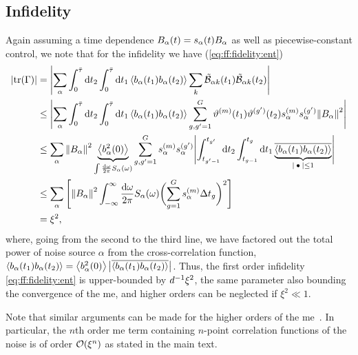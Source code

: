 \subsection{Infidelity}\label{subsec:app:ff:convergence:infidelity}
Again assuming a time dependence $B_\alpha(t) = s_\alpha(t)B_\alpha$ as well as piecewise-constant control, we note that for the infidelity we have (\cf \cref{eq:ff:fidelity:ent})
\begin{align}
    \abs{\tr(\decayamps)} &= \abs\Bigg{\sum_{\alpha}\int_0^{\bar{\tau}}\dd{t_2}\int_0^{\bar{\tau}}\dd{t_1}
                             \expval{b_\alpha(t_1)b_\alpha(t_2)}\sum_{k}\ctrlmat_{\alpha k}(t_1)\ctrlmat_{\alpha k}(t_2)} \notag\\
                          &\leq\abs\Bigg{\sum_{\alpha}\int_0^{\bar{\tau}}\dd{t_2}\int_0^{\bar{\tau}}\dd{t_1}
                             \expval{b_\alpha(t_1)b_\alpha(t_2)}\sum_{g,g^\prime=1}^{G}\vartheta\gth{m}(t_1)\vartheta^{(g^\prime)}(t_2)
                             s_\alpha\gth{m} s_\alpha^{(g^\prime)} \norm{B_\alpha}^2} \notag\\
                          &\leq\sum_{\alpha}\norm{B_\alpha}^2
                             \underbrace{\expval{b_\alpha^2(0)}}_{\int\frac{\dd{\omega}}{2\pi}S_\alpha(\omega)}
                             \sum_{g,g^\prime=1}^{G} s_\alpha\gth{m} s_\alpha^{(g^\prime)}
                             \abs\Bigg{\int_{t_{g^\prime-1}}^{t_{g^\prime}}\dd{t_2}\int_{t_{g-1}}^{t_g}\dd{t_1}
                             \underbrace{\overline{\expval{b_\alpha(t_1)b_\alpha(t_2)}}}_{\abs{\placeholder}\leq 1}} \notag\\
                          &\leq\sum_{\alpha}\left[\norm{B_\alpha}^2
                             \int_{-\infty}^\infty\frac{\mathrm{d}\omega}{2\pi}S_\alpha(\omega)
                             \biggl(\sum_{g=1}^{G}s_\alpha\gth{m}\Delta t_g\biggr)^2\right] \notag\\
                          &= \xi^2,
\end{align}
where, going from the second to the third line, we have factored out the total power of noise source $\alpha$ from the cross-correlation function, $\expval{b_\alpha(t_1) b_\alpha(t_2)} = \expval{b_\alpha^2(0)}\bigl\lvert\overline{\expval{b_\alpha(t_1)b_\alpha(t_2)}}\bigr\rvert$.
Thus, the first order infidelity \cref{eq:ff:fidelity:ent} is upper-bounded by $d^{-1}\xi^2$, the same parameter also bounding the convergence of the \gls{me}, and higher orders can be neglected if $\xi^2\ll 1$.

Note that similar arguments can be made for the higher orders of the \gls{me}~\cite{Green2013}.
In particular, the $n$th order \gls{me} term containing $n$-point correlation functions of the noise is of order $\order{\xi^n}$ as stated in the main text.

